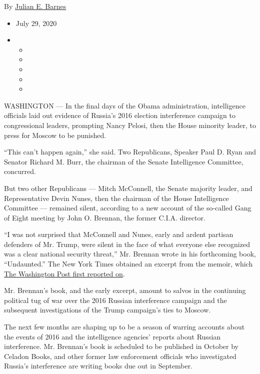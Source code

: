 By \href{https://www.nytimes.com/by/julian-e-barnes}{Julian E. Barnes}

\begin{itemize}
\item
  July 29, 2020
\item
  \begin{itemize}
  \item
  \item
  \item
  \item
  \item
  \end{itemize}
\end{itemize}

WASHINGTON --- In the final days of the Obama administration,
intelligence officials laid out evidence of Russia's 2016 election
interference campaign to congressional leaders, prompting Nancy Pelosi,
then the House minority leader, to press for Moscow to be punished.

``This can't happen again,'' she said. Two Republicans, Speaker Paul D.
Ryan and Senator Richard M. Burr, the chairman of the Senate
Intelligence Committee, concurred.

But two other Republicans --- Mitch McConnell, the Senate majority
leader, and Representative Devin Nunes, then the chairman of the House
Intelligence Committee --- remained silent, according to a new account
of the so-called Gang of Eight meeting by John O. Brennan, the former
C.I.A. director.

``I was not surprised that McConnell and Nunes, early and ardent
partisan defenders of Mr. Trump, were silent in the face of what
everyone else recognized was a clear national security threat,'' Mr.
Brennan wrote in his forthcoming book, ``Undaunted.'' The New York Times
obtained an excerpt from the memoir, which
\href{https://www.washingtonpost.com/national-security/ex-cia-director-brennan-writes-in-upcoming-memoir-that-trump-blocked-access-to-records-and-notes/2020/07/28/f70b833e-d0f1-11ea-9038-af089b63ac21_story.html}{The
Washington Post first reported on}.

Mr. Brennan's book, and the early excerpt, amount to salvos in the
continuing political tug of war over the 2016 Russian interference
campaign and the subsequent investigations of the Trump campaign's ties
to Moscow.

The next few months are shaping up to be a season of warring accounts
about the events of 2016 and the intelligence agencies' reports about
Russian interference. Mr. Brennan's book is scheduled to be published in
October by Celadon Books, and other former law enforcement officials who
investigated Russia's interference are writing books due out in
September.

